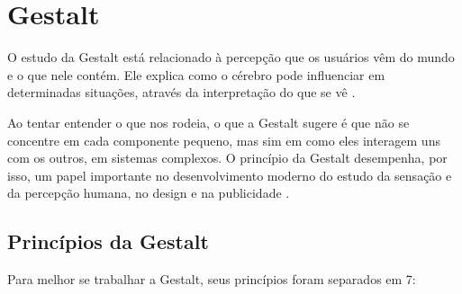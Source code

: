 \section{Gestalt}
\label{Princípios de Gestalt}
O estudo da Gestalt está relacionado à percepção que os usuários vêm do mundo e o que nele contém. Ele explica como o cérebro pode influenciar em determinadas situações, através da interpretação do que se vê \cite{gestalt7principios}.

Ao tentar entender o que nos rodeia, o que a Gestalt sugere é que não se concentre em cada componente pequeno, mas sim em como eles interagem uns com os outros, em sistemas complexos. O princípio da Gestalt desempenha, por isso, um papel importante no desenvolvimento moderno do estudo da sensação e da percepção humana, no design e na publicidade \cite{gestaltleticiasimoes}.

\subsection{Princípios da Gestalt}

Para melhor se trabalhar a Gestalt, seus princípios foram separados em 7:


